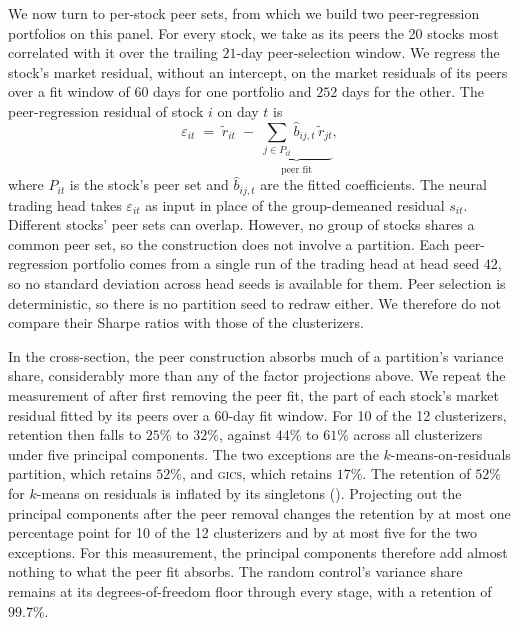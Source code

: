 We now turn to per-stock peer sets, from which we build two peer-regression portfolios on this panel. For every stock, we take as its peers the 20 stocks most correlated with it over the trailing $21$-day peer-selection window. We regress the stock's market residual, without an intercept, on the market residuals of its peers over a fit window of $60$ days for one portfolio and $252$ days for the other. The peer-regression residual of stock $i$ on day $t$ is
%
\begin{equation}\label{eq:peerres}
  \varepsilon_{it} \;=\; \tilde r_{it} \;-\; \underbrace{\sum_{j \in P_{it}} \hat b_{ij,t}\, \tilde r_{jt}}_{\text{peer fit}},
\end{equation}
%
where $P_{it}$ is the stock's peer set and $\hat b_{ij,t}$ are the fitted coefficients. The neural trading head takes $\varepsilon_{it}$ as input in place of the group-demeaned residual $s_{it}$. Different stocks' peer sets can overlap. However, no group of stocks shares a common peer set, so the construction does not involve a partition. Each peer-regression portfolio comes from a single run of the trading head at head seed $42$, so no standard deviation across head seeds is available for them. Peer selection is deterministic, so there is no partition seed to redraw either. We therefore do not compare their Sharpe ratios with those of the clusterizers.

In the cross-section, the peer construction absorbs much of a partition's variance share, considerably more than any of the factor projections above.
We repeat the measurement of  after first removing the peer fit, the part of each stock's market residual fitted by its peers over a $60$-day fit window. For 10 of the 12 clusterizers, retention then falls to $25\%$ to $32\%$, against $44\%$ to $61\%$ across all clusterizers under five
principal components. The two exceptions are the $k$-means-on-residuals partition, which retains $52\%$, and \textsc{gics}, which retains $17\%$. The retention of $52\%$ for $k$-means on residuals is inflated by its singletons (). Projecting out the principal components after the peer removal changes the retention by at most one percentage point for 10 of the 12 clusterizers and by at most five for the two exceptions. For this measurement, the principal components therefore add almost nothing to what the peer fit absorbs. The random control's variance share remains at its degrees-of-freedom floor through every stage, with a retention of $99.7\%$.

